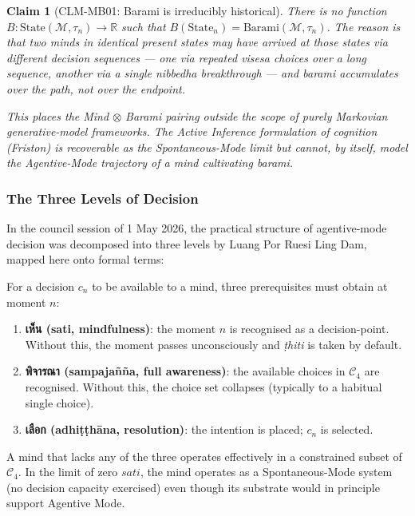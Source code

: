 \documentclass[12pt, a4paper]{article}
\newtheorem{claim}{Claim}[section]
\begin{document}
\begin{claim}[CLM-MB01: Barami is irreducibly historical]
\label{mbv1:clm:mb01}
There is no function $B: \mathrm{State}(\mathcal{M}, \tau_n) \to
\mathbb{R}$ such that $B(\mathrm{State}_n) =
\mathrm{Barami}(\mathcal{M}, \tau_n)$. The reason is that two minds
in identical present states may have arrived at those states via
different decision sequences --- one via repeated \emph{visesa}
choices over a long sequence, another via a single \emph{nibbedha}
breakthrough --- and barami accumulates over the path, not over the
endpoint.

This places the Mind $\otimes$ Barami pairing outside the scope of
purely Markovian generative-model frameworks. The Active Inference
formulation of cognition (Friston) is recoverable as the
Spontaneous-Mode limit but cannot, by itself, model the Agentive-Mode
trajectory of a mind cultivating barami.
\end{claim}

\subsubsection{The Three Levels of Decision}

In the council session of 1 May 2026, the practical structure of
agentive-mode decision was decomposed into three levels by Luang Por
Ruesi Ling Dam, mapped here onto formal terms:

\begin{formalbox}[title={DEF-MB06: Three Levels of Decision-Capacity}]
For a decision $c_n$ to be available to a mind, three
prerequisites must obtain at moment $n$:
\begin{enumerate}[leftmargin=*]
\item \textbf{เห็น (sati, mindfulness)}: the moment $n$ is
recognised as a decision-point. Without this, the moment passes
unconsciously and \emph{ṭhiti} is taken by default.
\item \textbf{พิจารณา (sampajañña, full awareness)}: the available
choices in $\mathcal{C}_4$ are recognised. Without this, the choice
set collapses (typically to a habitual single choice).
\item \textbf{เลือก (adhiṭṭhāna, resolution)}: the intention is
placed; $c_n$ is selected.
\end{enumerate}
A mind that lacks any of the three operates effectively in a
constrained subset of $\mathcal{C}_4$. In the limit of zero $sati$,
the mind operates as a Spontaneous-Mode system (no decision capacity
exercised) even though its substrate would in principle support
Agentive Mode.
\end{formalbox}
\end{document}
